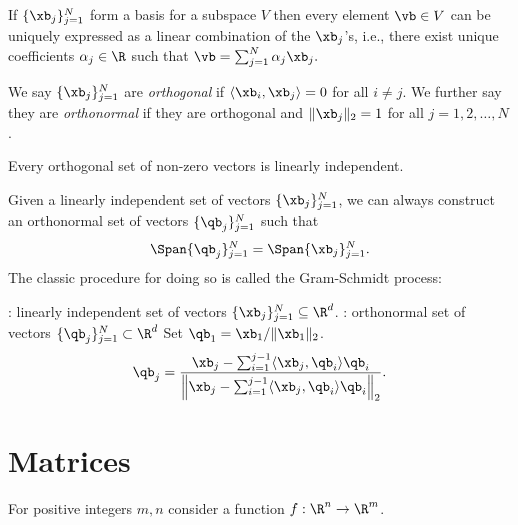 \begin{lemma}
If $\{ \xb_j\}_{j=1}^N$ form a basis for a subspace $V$ then every element 
$\vb \in V$ can be uniquely expressed as a linear combination of 
the $\xb_j$'s, i.e., there exist unique coefficients $\alpha_j \in \R$ such that
$\vb = \sum_{j=1}^N \alpha_j \xb_j.$    
\end{lemma}




We say  $\{\xb_j\}_{j=1}^N$ 
are {\it orthogonal} if $\langle \xb_i, \xb_j \rangle = 0$ for all $i \neq j$.
We further say they are {\it orthonormal} if they are orthogonal and $\|\xb_j\|_2 = 1$ for all $j=1,2,\ldots,N$. 

\begin{lemma}
    Every orthogonal set of non-zero vectors is linearly independent.
\end{lemma}

Given a linearly independent set of vectors $\{ \xb_j \}_{j=1}^N$, 
we can always construct an orthonormal set of vectors $\{\qb_j\}_{j=1}^N$
such that 
\begin{equation*}
    \Span\{\qb_j\}_{j=1}^N = \Span\{\xb_j\}_{j=1}^N.
\end{equation*}
The classic procedure for doing so is called the Gram-Schmidt process: 
\begin{algorithm}
\caption{Gram-Schmidt Process}
\begin{algorithmic}
    : linearly independent set of vectors 
    $\{\xb_j\}_{j=1}^N \subseteq \R^d$.
    : orthonormal set of vectors $\{\qb_j\}_{j=1}^N \subset \R^d$
    \vspace{2ex}
    \State Set $\qb_1 = \xb_1 / \|\xb_1\|_2$.
        \State 
        \begin{equation*}
            \qb_j = \frac{\xb_j - \sum_{i=1}^{j-1} \langle \xb_j, \qb_i \rangle \qb_i}{\left\| \xb_j - \sum_{i=1}^{j-1} \langle \xb_j, \qb_i \rangle \qb_i \right\|_2}.
        \end{equation*}
    \EndFor
\end{algorithmic}
\end{algorithm}


\section{Matrices}

For positive integers $m, n$ consider a function $f: \R^n \to \R^m$. 


